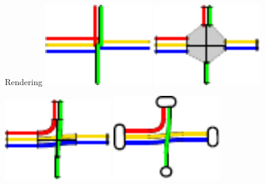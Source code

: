 \documentclass{beamer}
\begin{document}
\begin{frame}{Rendering}
	\includegraphics[width=0.35\textwidth]{figures/render_example1.pdf}\hfill
	\includegraphics[width=0.35\textwidth]{figures/render_example2.pdf}

	\vspace{1cm}

	\includegraphics[width=0.35\textwidth]{figures/render_example3.pdf}\hfill
	\includegraphics[width=0.35\textwidth]{figures/render_example4.pdf}
\end{frame}
\end{document}
